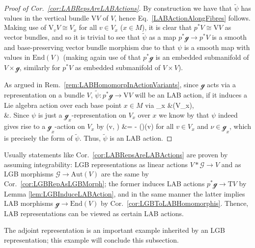 \documentclass[a4paper,oneside,11pt,bibliography=totoc]{scrartcl}
\def\bas#1\eas{\begin{align*}#1\end{align*}}
\theoremstyle{plain}
\theoremstyle{remark}
\theoremstyle{definition}
\begin{document}
\begin{proof}[Proof of Cor.\ \ref{cor:LABRepsAreLABActions}]
\leavevmode\newline
By construction we have that $\widetilde{\psi}$ has values in the vertical bundle $\mathrm{V}V$ of $V$, hence Eq.\ \eqref{LABActionAlongFibres} follows. 
Making use of $\mathrm{V}_vV \cong V_x$ for all $v\in V_x$ ($x \in M$), it is clear that $p^*V \cong \mathrm{V}V$ as vector bundles, and so it is trivial to see that $\widetilde{\psi}$ as a map $p^*\mathcal{g} \to p^*V$ is a smooth and base-preserving vector bundle morphism due to that $\psi$ is a smooth map with values in $\mathrm{End}(V)$ (making again use of that $p^*\mathcal{g}$ is an embedded submanifold of $V \times \mathcal{g}$, similarly for $p^*V$ as embedded submanifold of $V \times V$).

As argued in Rem.\ \ref{rem:LABHomomorpInActionVariants}, since $\mathcal{g}$ acts via a representation on a bundle $V$, $\widetilde{\psi}: p^*\mathcal{g} \to \mathrm{V}V$ will be an LAB action, if it induces a Lie algebra action over each base point $x \in M$ via
\bas
\mathcal{g}_x &\to {}(V_x),\\
\nu &\mapsto {}.
\eas
Since $\psi$ is just a $\mathcal{g}_x$-representation on $V_x$ over $x$ we know by \cite[\S 2.1, proof of Prop.\ 2.1.16, page 22]{MyThesis} that $\psi$ indeed gives rise to a $\mathcal{g}_x$-action on $V_x$ by
\bas
\widetilde{\psi}\mleft(v, \nu\mright)
&=
- \psi(\nu)(v)
\eas
for all $v \in V_x$ and $\nu \in \mathcal{g}_x$, which is precisely the form of $\widetilde{\psi}$. Thus, $\widetilde{\psi}$ is an LAB action.
\end{proof}

Usually statements like Cor.\ \ref{cor:LABRepsAreLABActions} are proven by assuming integrability: LGB representations as linear actions $V*\mathcal{G} \to V$ and as LGB morphisms $\mathcal{G} \to \mathrm{Aut}(V)$ are the same by Cor.\ \ref{cor:LGBRepAsLGBMorph}; the former induces LAB actions $p^*\mathcal{g} \to \mathrm{T}V$ by Lemma \ref{lem:LGBInduceLABAction}, and in the same manner the latter implies LAB morphisms $\mathcal{g} \to \mathrm{End}(V)$ by Cor.\ \ref{cor:LGBToLABHomomorphis}. Thence, LAB representations can be viewed as certain LAB actions. 

The adjoint representation is an important example inherited by an LGB representation; this example will conclude this subsection.
\end{document}
